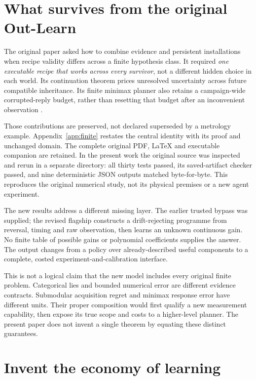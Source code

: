 \documentclass[11pt,letterpaper]{article}
\theoremstyle{definition}\newtheorem{definition}[theorem]{Definition}
\theoremstyle{remark}\newtheorem{remark}[theorem]{Remark}
\begin{document}
\section{What survives from the original Out-Learn}
\label{sec:lineage}
The original paper asked how to combine evidence and persistent installations when recipe validity differs across a finite hypothesis class. It required \emph{one executable recipe that works across every survivor}, not a different hidden choice in each world. Its continuation theorem prices unresolved uncertainty across future compatible inheritance. Its finite minimax planner also retains a campaign-wide corrupted-reply budget, rather than resetting that budget after an inconvenient observation \cite{original}.

Those contributions are preserved, not declared superseded by a metrology example. Appendix~\ref{app:finite} restates the central identity with its proof and unchanged domain. The complete original PDF, LaTeX and executable companion are retained. In the present work the original source was inspected and rerun in a separate directory: all thirty tests passed, its saved-artifact checker passed, and nine deterministic JSON outputs matched byte-for-byte. This reproduces the original numerical study, not its physical premises or a new agent experiment.

The new results address a different missing layer. The earlier trusted bypass was supplied; the revised flagship constructs a drift-rejecting programme from reversal, timing and raw observation, then learns an unknown continuous gain. No finite table of possible gains or polynomial coefficients supplies the answer. The output changes from a policy over already-described useful components to a complete, costed experiment-and-calibration interface.

This is not a logical claim that the new model includes every original finite problem. Categorical lies and bounded numerical error are different evidence contracts. Submodular acquisition regret and minimax response error have different units. Their proper composition would first qualify a new measurement capability, then expose its true scope and costs to a higher-level planner. The present paper does not invent a single theorem by equating these distinct guarantees.

\section{Invent the economy of learning}
\label{sec:economy}
\end{document}
